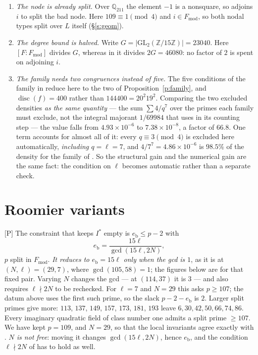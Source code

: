 \documentclass[11pt]{article}
\theoremstyle{plain}
\theoremstyle{definition}
\newcommand{\Fmod}{F_{\mathrm{mod}}}
\begin{document}
\begin{enumerate}[label=(\roman*),itemsep=2pt]
\item \emph{The node is already split.}  Over $\mathbb{Q}_{211}$ the element $-1$ is
 a nonsquare, so \cite{First} adjoins $i$ to split the bad node.  Here $109\equiv1
 \pmod4$ and $i\in\Fmod$, so both nodal types split over $L$ itself
 (\S\ref{s:geom}).
\item \emph{The degree bound is halved.}  Write
 $G=|\mathrm{GL}_2(\mathbb Z/15\mathbb Z)|=23040$.  Here $[F:\Fmod]$ divides $G$,
 whereas in \cite{First} it divides $2G=46080$: no factor of $2$ is spent on
 adjoining $i$.
\item \emph{The family needs two congruences instead of five.}  The five conditions
 of the family in \cite[Prop.~9.4]{Firstfull} reduce here to the two of
 Proposition~\ref{p:family}, and $\operatorname{disc}(f)=400$ rather than
 $144400=20^2 19^2$.  Comparing the two excluded densities \emph{as the same
 quantity} --- the sum $\sum4/q^7$ over the primes each family must exclude, not the
 integral majorant $1/69984$ that \cite[App.~D]{Firstfull} uses in its counting step --- the
 value falls from $4.93\times10^{-6}$ to $7.38\times10^{-8}$, a factor of $66.8$.
 One term accounts for almost all of it: every $q\equiv3\pmod4$ is excluded here
 automatically, \emph{including $q=\ell=7$}, and $4/7^7=4.86\times10^{-6}$ is
 $98.5\%$ of the density for the family of \cite{Firstfull}.  So the structural gain and the numerical
 gain are the same fact: the condition on $\ell$ becomes automatic rather than a
 separate check.
\end{enumerate}

\section{Roomier variants}\label{s:variants}

\textup{[P]} The constraint that keeps $I^{*}$ empty is $e_{\mathrm b}\le p-2$ with
\[
 e_{\mathrm b}=\frac{15\ell}{\gcd(15\ell,2N)},
\]
$p$ split in $\Fmod$.  \emph{It reduces to $e_{\mathrm b}=15\ell$ only when the gcd is
$1$}, as it is at $(N,\ell)=(29,7)$, where $\gcd(105,58)=1$; the figures below are for
that fixed pair.  Varying $N$ changes the gcd --- at $(114,37)$ it is $3$ --- and also
requires $\ell\nmid2N$ to be rechecked.  For $\ell=7$ and $N=29$ this asks
$p\ge107$; the datum above uses the first such prime, so the slack $p-2-e_{\mathrm b}$
is $2$.  Larger split primes give more: $113$, $137$, $149$, $157$, $173$, $181$,
$193$ leave $6,30,42,50,66,74,86$.  Every imaginary quadratic field of class number
one admits a split prime $\ge107$.  We have kept $p=109$, and $N=29$, so that the
local invariants agree exactly with \cite{First}.  \emph{$N$ is not free}: moving it
changes $\gcd(15\ell,2N)$, hence $e_{\mathrm b}$, and the condition $\ell\nmid2N$ of
\cite[Def.~3.1(c)]{IUT1} has to hold as well.
\end{document}
